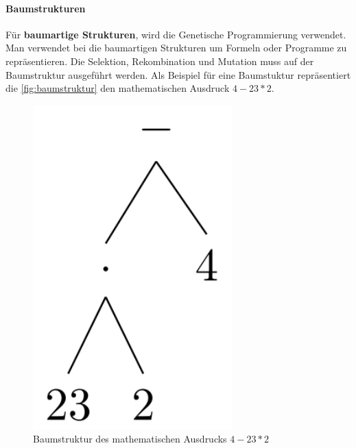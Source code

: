 \paragraph{Baumstrukturen}
F{\"u}r \textbf{baumartige Strukturen}, wird die Genetische Programmierung verwendet. Man verwendet bei die baumartigen Strukturen um Formeln oder Programme zu repräsentieren. Die Selektion, Rekombination und Mutation muss auf der Baumstruktur ausgeführt werden.
Als Beispiel für eine Baumstuktur repräsentiert die \autoref{fig:baumstruktur} den mathematischen Ausdruck $4 - 23 * 2$.

\begin{figure}
	\centering
    \includegraphics{pics/grundlage/baumstruktur.png}
    \caption{Baumstruktur des mathematischen Ausdrucks $4 - 23 * 2$}
    \label{fig:baumstruktur}
\end{figure}













